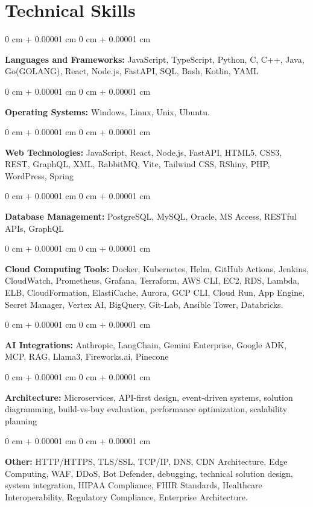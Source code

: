 \documentclass[10pt, letterpaper]{article}
\newenvironment{onecolentry}{
    \begin{adjustwidth}{
        0 cm + 0.00001 cm
    }{
        0 cm + 0.00001 cm
    }
}{
    \end{adjustwidth}
} %
\begin{document}
    \section{Technical Skills}
    \vspace{2 pt }
    \begin{onecolentry}
    \textbf{Languages and Frameworks:} JavaScript, TypeScript, Python, C, C++, Java, Go(GOLANG), React, Node.js, FastAPI, SQL, Bash, Kotlin, YAML
    \end{onecolentry}
    \begin{onecolentry}
        \textbf{Operating Systems:} Windows, Linux, Unix, Ubuntu.
    \end{onecolentry}
    \begin{onecolentry}
         \textbf{Web Technologies:} JavaScript, React, Node.js, FastAPI, HTML5, CSS3, REST, GraphQL, XML, RabbitMQ, Vite, Tailwind CSS, RShiny, PHP, WordPress, Spring
    \end{onecolentry}
    \begin{onecolentry}
        \textbf{Database Management:} PostgreSQL, MySQL, Oracle, MS Access, RESTful APIs, GraphQL
    \end{onecolentry}
    \begin{onecolentry}
        \textbf{Cloud Computing Tools:}
Docker, Kubernetes, Helm, GitHub Actions, Jenkins, CloudWatch, Prometheus, Grafana, Terraform, AWS CLI, EC2, RDS, Lambda, ELB, CloudFormation, ElastiCache, Aurora, GCP CLI, Cloud Run, App Engine, Secret Manager, Vertex AI, BigQuery, Git-Lab, Ansible Tower, Databricks.
    \end{onecolentry}
    \begin{onecolentry}
         \textbf{AI Integrations:} Anthropic, LangChain, Gemini Enterprise, Google ADK, MCP, RAG, Llama3, Fireworks.ai, Pinecone
    \end{onecolentry}
    \begin{onecolentry}
        \textbf{Architecture:} Microservices, API-first design, event-driven systems, solution diagramming, build-vs-buy evaluation, performance optimization, scalability planning
    \end{onecolentry}
        \begin{onecolentry}
     \textbf{Other:} HTTP/HTTPS, TLS/SSL, TCP/IP, DNS, CDN Architecture, Edge Computing, WAF, DDoS, Bot Defender, debugging, technical solution design, system integration, HIPAA Compliance, FHIR Standards, Healthcare Interoperability, Regulatory Compliance, Enterprise Architecture.
    \end{onecolentry}
\end{document}
